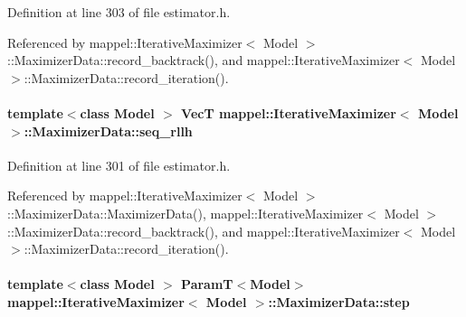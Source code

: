 Definition at line 303 of file estimator.\+h.



Referenced by mappel\+::\+Iterative\+Maximizer$<$ Model $>$\+::\+Maximizer\+Data\+::record\+\_\+backtrack(), and mappel\+::\+Iterative\+Maximizer$<$ Model $>$\+::\+Maximizer\+Data\+::record\+\_\+iteration().

\paragraph[{\texorpdfstring{seq\+\_\+rllh}{seq_rllh}}]{\setlength{\rightskip}{0pt plus 5cm}template$<$class Model $>$ {\bf VecT} {\bf mappel\+::\+Iterative\+Maximizer}$<$ Model $>$\+::Maximizer\+Data\+::seq\+\_\+rllh\hspace{0.3cm}{\ttfamily [protected]}}\hypertarget{classmappel_1_1IterativeMaximizer_1_1MaximizerData_aaf6e3749e8bf4e8714bac4a48902a4cb}{}\label{classmappel_1_1IterativeMaximizer_1_1MaximizerData_aaf6e3749e8bf4e8714bac4a48902a4cb}


Definition at line 301 of file estimator.\+h.



Referenced by mappel\+::\+Iterative\+Maximizer$<$ Model $>$\+::\+Maximizer\+Data\+::\+Maximizer\+Data(), mappel\+::\+Iterative\+Maximizer$<$ Model $>$\+::\+Maximizer\+Data\+::record\+\_\+backtrack(), and mappel\+::\+Iterative\+Maximizer$<$ Model $>$\+::\+Maximizer\+Data\+::record\+\_\+iteration().

\paragraph[{\texorpdfstring{step}{step}}]{\setlength{\rightskip}{0pt plus 5cm}template$<$class Model $>$ {\bf ParamT}$<$Model$>$ {\bf mappel\+::\+Iterative\+Maximizer}$<$ Model $>$\+::Maximizer\+Data\+::step}\hypertarget{classmappel_1_1IterativeMaximizer_1_1MaximizerData_af592d029ed46c5ec9bedd2291db12920}{}\label{classmappel_1_1IterativeMaximizer_1_1MaximizerData_af592d029ed46c5ec9bedd2291db12920}


